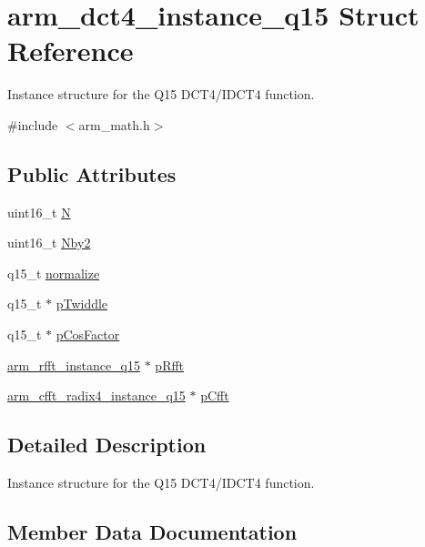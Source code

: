 \hypertarget{structarm__dct4__instance__q15}{}\section{arm\+\_\+dct4\+\_\+instance\+\_\+q15 Struct Reference}
\label{structarm__dct4__instance__q15}


Instance structure for the Q15 D\+C\+T4/\+I\+D\+C\+T4 function.  




{\ttfamily \#include $<$arm\+\_\+math.\+h$>$}

\subsection*{Public Attributes}
\begin{DoxyCompactItemize}
\item 
uint16\+\_\+t \hyperlink{structarm__dct4__instance__q15_a53d24009bb9b2e93d0aa07db7f1a6c25}{N}
\item 
uint16\+\_\+t \hyperlink{structarm__dct4__instance__q15_af43dcbbc2fc661ffbc525afe3dcbd7da}{Nby2}
\item 
q15\+\_\+t \hyperlink{structarm__dct4__instance__q15_a197098140d68e89a08f7a249003a0b86}{normalize}
\item 
q15\+\_\+t $\ast$ \hyperlink{structarm__dct4__instance__q15_abc6c847e9f906781e1d5da40e9aafa76}{p\+Twiddle}
\item 
q15\+\_\+t $\ast$ \hyperlink{structarm__dct4__instance__q15_ac76df681b1bd502fb4874c06f055dded}{p\+Cos\+Factor}
\item 
\hyperlink{structarm__rfft__instance__q15}{arm\+\_\+rfft\+\_\+instance\+\_\+q15} $\ast$ \hyperlink{structarm__dct4__instance__q15_a11cf95c1cd9dd2dd5e4b81b8f88dc208}{p\+Rfft}
\item 
\hyperlink{structarm__cfft__radix4__instance__q15}{arm\+\_\+cfft\+\_\+radix4\+\_\+instance\+\_\+q15} $\ast$ \hyperlink{structarm__dct4__instance__q15_a7284932ee8c36107c33815eb62eadffc}{p\+Cfft}
\end{DoxyCompactItemize}


\subsection{Detailed Description}
Instance structure for the Q15 D\+C\+T4/\+I\+D\+C\+T4 function. 

\subsection{Member Data Documentation}
